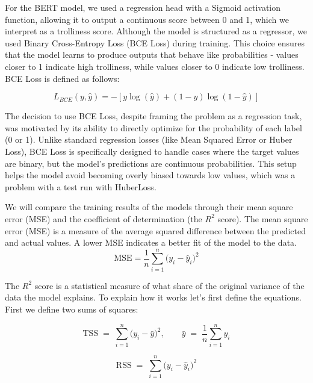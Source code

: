 \documentclass[twoside]{ctuthesis}
\theoremstyle{plain}
\theoremstyle{definition}
\theoremstyle{note}
\begin{document}
For the BERT model, we used a regression head with a Sigmoid activation function, allowing it to output a continuous score between 0 and 1, which we interpret as a trolliness score. Although the model is structured as a regressor, we used Binary Cross-Entropy Loss (BCE Loss) during training. This choice ensures that the model learns to produce outputs that behave like probabilities - values closer to 1 indicate high trolliness, while values closer to 0 indicate low trolliness. BCE Loss is defined as follows:

\begin{equation}
L_{BCE}(y, \hat{y}) = - \left[ y \log(\hat{y}) + (1 - y) \log(1 - \hat{y}) \right]
\end{equation}

The decision to use BCE Loss, despite framing the problem as a regression task, was motivated by its ability to directly optimize for the probability of each label (0 or 1). Unlike standard regression losses (like Mean Squared Error or Huber Loss), BCE Loss is specifically designed to handle cases where the target values are binary, but the model's predictions are continuous probabilities. This setup helps the model avoid becoming overly biased towards low values, which was a problem with a test run with HuberLoss.\par 

We will compare the training results of the models through their mean square error (MSE) and the coefficient of determination (the $R^2$ score). The mean square error (MSE) is a measure of the average squared difference between the predicted and actual values. A lower MSE indicates a better fit of the model to the data. 
\begin{equation}
	\mathrm{MSE} = \frac{1}{n}\sum_{i=1}^{n}\bigl(y_i - \hat{y}_i\bigr)^2
\end{equation}

The $R^2$ score is a statistical measure of what share of the original variance of the data the model explains. To explain how it works let's first define the equations. First we define two sums of squares:\par
\begin{equation}
	\mathrm{TSS} \;=\; \sum_{i=1}^{n} \bigl(y_i - \bar{y}\bigr)^2,
	\qquad
	\bar{y} \;=\; \frac{1}{n}\sum_{i=1}^{n} y_i
\end{equation}


\begin{equation}
	\mathrm{RSS} \;=\; \sum_{i=1}^{n} \bigl(y_i - \hat{y}_i\bigr)^2
\end{equation}
\end{document}
